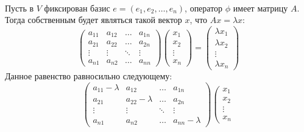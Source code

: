 \begin{algorithm}~

    Пусть в $V$ фиксирован базис $e = (e_1, e_2, \dots, e_n)$, оператор $\phi$ имеет матрицу $A$.
    Тогда собственным будет являться такой вектор $x$, что $Ax = \lambda x$:
    \begin{equation*}
        \left(
            \begin{array}{cccc}
            a_{11} & a_{12} & \ldots & a_{1n}\\
            a_{21} & a_{22} & \ldots & a_{2n}\\
            \vdots & \vdots & \ddots & \vdots\\
            a_{n1} & a_{n2} & \ldots & a_{nn}
            \end{array}
        \right) \left(
            \begin{array}{c}
            x_{1}\\
            x_{2}\\
            \vdots\\
            x_{n}
            \end{array}
        \right) = \left(
            \begin{array}{c}
            \lambda x_{1}\\
            \lambda x_{2}\\
            \vdots\\
            \lambda x_{n}
            \end{array} 
        \right)
    \end{equation*}
    Данное равенство равносильно следующему:
    \begin{equation*}
        \left(
            \begin{array}{cccc}
            a_{11} - \lambda & a_{12}           & \ldots & a_{1n}\\
            a_{21}           & a_{22} - \lambda & \ldots & a_{2n}\\
            \vdots           & \vdots           & \ddots & \vdots\\
            a_{n1}           & a_{n2}           & \ldots & a_{nn} - \lambda
            \end{array}
        \right) \left(
            \begin{array}{c}
            x_{1}\\
            x_{2}\\
            \vdots\\
            x_{n}
            \end{array}

\end{equation*}
\end{algorithm}
